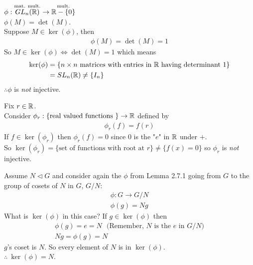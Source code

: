 \begin{example}
$\phi:\overset{\text{mat. mult.}}{GL_n({\mathbb{ R}})}\rightarrow \overset{\text{mult.}}{{\mathbb{ R}}-\{0\}}$ \\
$\phi(M)=\det(M)$. \\
Suppose $M\in \ker(\phi)$, then
\begin{align}
    \phi(M)=\det(M)=1 \nonumber
\end{align}
So $M\in \ker(\phi) \iff \det(M)=1$ which means
\begin{align}
    \text{ker}(\phi)&=\{n\times n \text{ matrices with entries in }{\mathbb{ R}} \text{ having determinant }1\}\nonumber \\
    &=SL_n({\mathbb{ R}}) \neq \{I_n\} \nonumber
\end{align}
$\therefore \phi$ is \textit{not} injective.
\end{example}

\begin{example}
Fix $r\in {\mathbb{ R}}$. \\
Consider $\phi_r: \{\text{real valued functions }\}\rightarrow {\mathbb{ R}}$ defined by
\begin{align}
    \phi_r(f)=f(r)\nonumber
\end{align}
If $f\in \ker(\phi_r)$ then $\phi_r(f)=0$ since $0$ is the "$e$" in ${\mathbb{ R}}$ under $+$. \\
So $\ker(\phi_r) = \{\text{set of functions with root at } r\} \neq \{f(x)=0\}$ so $\phi_r$ is \textit{not} injective.
\end{example}

\begin{example}
Assume $N\triangleleft G$ and consider again the $\phi$ from Lemma 2.7.1 going from $G$ to the group of cosets of $N$ in $G$, $G/N$:
\begin{align}
    \phi: G\rightarrow G/N \nonumber \\
    \phi(g)= Ng \nonumber
\end{align}
What is $\ker(\phi)$ in this case? If $g\in \ker(\phi)$ then
\begin{align}
    \phi(g)=e= N \ \ \ \text{(Remember, $N$ is the $e$ in $G/N$)}\nonumber \\
    Ng=\phi(g)=N \nonumber
\end{align}
$g$'s coset is $N$. So every element of $N$ is in $\ker(\phi)$.\\
$\therefore \ \ker(\phi)=N$. 
\end{example}


